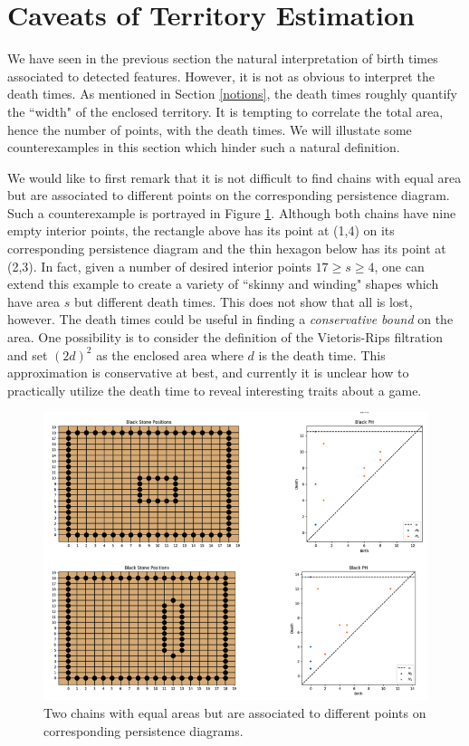 \documentclass[11pt]{article}
\begin{document}
\section{Caveats of Territory Estimation}
We have seen in the previous section the natural interpretation of birth times associated to detected features. However, it is not as obvious to interpret the death times. As mentioned in Section \ref{notions}, the death times roughly quantify the ``width" of the enclosed territory. It is tempting to correlate the total area, hence the number of points, with the death times. We will illustate some counterexamples in this section which hinder such a natural definition.

We would like to first remark that it is not difficult to find chains with equal area but are associated to different points on the corresponding persistence diagram. Such a counterexample is portrayed in Figure \ref{fig:counter1}. Although both chains have nine empty interior points, the rectangle above has its point at (1,4) on its corresponding persistence diagram and the thin hexagon below has its point at (2,3). In fact, given a number of desired interior points $17 \geq s \geq 4$, one can extend this example to create a variety of ``skinny and winding" shapes which have area $s$ but different death times. This does not show that all is lost, however. The death times could be useful in finding a \textit{conservative bound} on the area. One possibility is to consider the definition of the Vietoris-Rips filtration and set $(2d)^2$ as the enclosed area where $d$ is the death time. This approximation is conservative at best, and currently it is unclear how to practically utilize the death time to reveal interesting traits about a game.
\begin{figure}[ht]
  \centering
  \includegraphics[scale=0.8]{counter1.png}
  \caption{Two chains with equal areas but are associated to different points on corresponding persistence diagrams.}
  \label{fig:counter1}
\end{figure}
\end{document}
